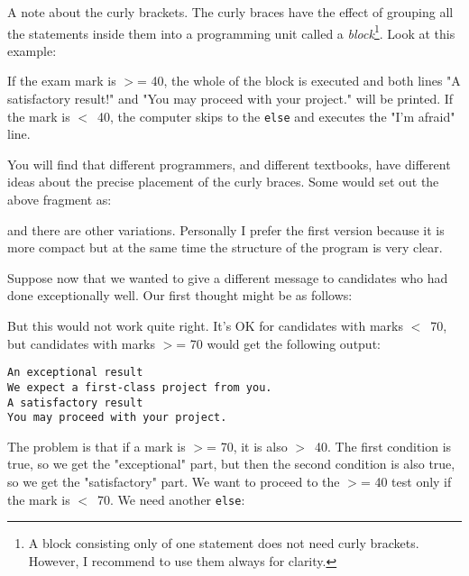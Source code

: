 
A note about the curly brackets. The curly braces have the effect of
grouping all the statements inside 
them into a programming unit called a \emph{block}\footnote{A block
  consisting only of one statement does not need curly
  brackets. However, I recommend to use them always for
  clarity.}. Look at this example: 


If the exam mark is $>$= 40, the whole of the block is executed and both
lines "A satisfactory result!" and "You may proceed with your
project." will be printed.  If the mark is $<$~40, the computer skips to
the \verb!else! and executes the "I'm afraid" line.

You will find that different programmers, and different textbooks, have
different ideas about the precise placement of the curly braces.  Some would
set out the above fragment as:


and there are other variations. Personally I prefer the first version
because it is more compact but at the same time the structure of the
program is very clear. 

Suppose now that we wanted to give a different message to candidates who
had done exceptionally well. Our first thought might be as follows:


But this would not work quite right.  It's OK for candidates with marks $<$~70,
but candidates with marks $>$= 70 would get the following output:

\begin{Verbatim}
An exceptional result
We expect a first-class project from you.
A satisfactory result
You may proceed with your project.
\end{Verbatim}

The problem is that if a mark is $>$= 70, it is also $>$~40.  The first
condition is true, so we get the "exceptional" part, but then the second
condition is also true, so we get the "satisfactory" part.  We want to
proceed to the $>$= 40 test only if the mark is $<$~70.  We need another
\verb!else!:

